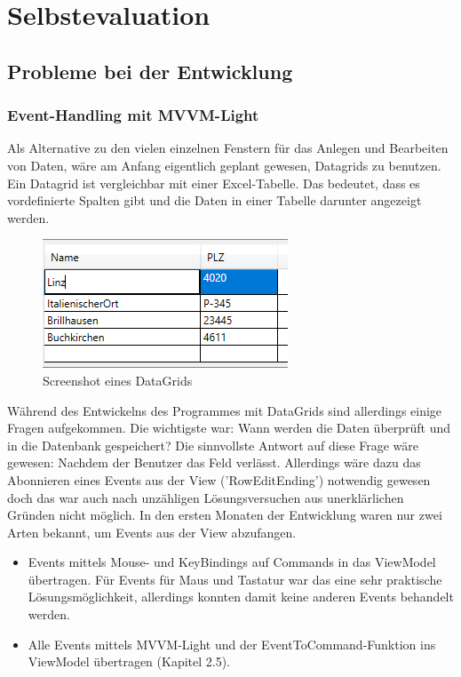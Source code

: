 \chapter{Selbstevaluation}\label{cha:theoretical-background}
\section{Probleme bei der Entwicklung}
\subsection{Event-Handling mit MVVM-Light}
Als Alternative zu den vielen einzelnen Fenstern für das Anlegen und Bearbeiten von Daten, wäre am Anfang eigentlich geplant gewesen, Datagrids zu benutzen. Ein Datagrid ist vergleichbar mit einer Excel-Tabelle. Das bedeutet, dass es vordefinierte Spalten gibt und die Daten in einer Tabelle darunter angezeigt werden. 
\begin{figure}[H]
\begin{center}
	\includegraphics[scale=.75]{images/datagrid.png}
\end{center}
	\caption{Screenshot eines DataGrids}
	\label{fig:sample}
\end{figure}
Während des Entwickelns des Programmes mit DataGrids sind allerdings einige Fragen aufgekommen. Die wichtigste war: Wann werden die Daten überprüft und in die Datenbank gespeichert? Die sinnvollste Antwort auf diese Frage wäre gewesen: Nachdem der Benutzer das Feld verlässt. Allerdings wäre dazu das Abonnieren eines Events aus der View ('RowEditEnding') notwendig gewesen doch das war auch nach unzähligen Lösungsversuchen aus unerklärlichen Gründen nicht möglich. In den ersten Monaten der Entwicklung waren nur zwei Arten bekannt, um Events aus der View abzufangen. 
\begin{itemize}
\item Events mittels Mouse- und KeyBindings auf Commands in das ViewModel übertragen. Für Events für Maus und Tastatur war das eine sehr praktische Lösungsmöglichkeit, allerdings konnten damit keine anderen Events behandelt werden.
\item Alle Events mittels MVVM-Light und der EventToCommand-Funktion ins ViewModel übertragen (Kapitel 2.5).
\end{itemize}
